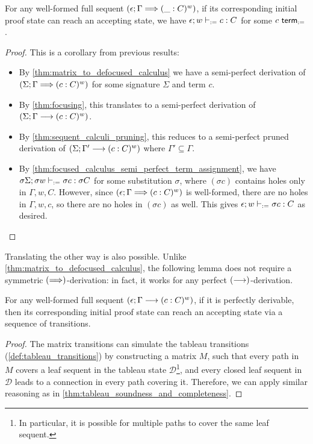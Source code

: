 \documentclass[twoside]{report}
\begin{document}
\begin{proposition}[Soundness]
    \label{thm:matrix_soundness}
    For any well-formed full sequent $(\epsilon; \Gamma \Longrightarrow (\_ : C)^w)$, if its corresponding initial proof state can reach an accepting state, we have $\epsilon; w \vdash_{:=} c : C$ for some $c \ \mathsf{term}_{:=}$.
\end{proposition}

\begin{proof}
    This is a corollary from previous results:
    \begin{itemize}
        \item By \cref{thm:matrix_to_defocused_calculus} we have a semi-perfect derivation of $(\Sigma; \Gamma \Longrightarrow (c : C)^w)$ for some signature $\Sigma$ and term $c$.
        \item By \cref{thm:focusing}, this translates to a semi-perfect derivation of $(\Sigma; \Gamma \longrightarrow (c : C)^w)$.
        \item By \cref{thm:sequent_calculi_pruning}, this reduces to a semi-perfect pruned derivation of $(\Sigma; \Gamma' \longrightarrow (c : C)^w)$ where $\Gamma' \subseteq \Gamma$.
        \item By \cref{thm:focused_calculus_semi_perfect_term_assignment}, we have $\sigma \Sigma; \sigma w \vdash_{:=} \sigma c : \sigma C$ for some substitution $\sigma$, where $(\sigma c)$ contains holes only in $\Gamma, w, C$. However, since $(\epsilon; \Gamma \Longrightarrow (c : C)^w)$ is well-formed, there are no holes in $\Gamma, w, c$, so there are no holes in $(\sigma c)$ as well. This gives $\epsilon; w \vdash_{:=} \sigma c : C$ as desired. \qedhere
    \end{itemize}
\end{proof}

Translating the other way is also possible. Unlike \cref{thm:matrix_to_defocused_calculus}, the following lemma does not require a symmetric $(\Longrightarrow)$-derivation: in fact, it works for any perfect $(\longrightarrow)$-derivation.

\begin{proposition}[Simulation]
    \label{thm:focused_calculus_to_matrix}
    For any well-formed full sequent $(\epsilon; \Gamma \longrightarrow (c : C)^w)$, if it is perfectly derivable, then its corresponding initial proof state can reach an accepting state via a sequence of transitions.
\end{proposition}

\begin{proof}
    The matrix transitions can simulate the tableau transitions (\cref{def:tableau_transitions}) by constructing a matrix $M$, such that every path in $M$ covers a leaf sequent in the tableau state $\mathcal D$\footnote{In particular, it is possible for multiple paths to cover the same leaf sequent.}, and every closed leaf sequent in $\mathcal D$ leads to a connection in every path covering it. Therefore, we can apply similar reasoning as in \cref{thm:tableau_soundness_and_completeness}.
\end{proof}
\end{document}
